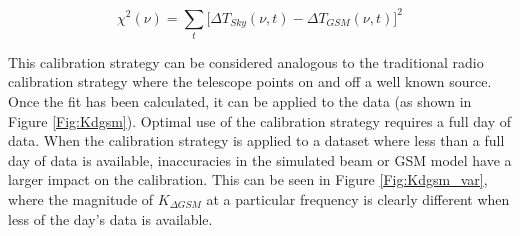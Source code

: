 \begin{equation}\label{Eq:chi_sq}
\chi^2(\nu) =  \sum_t \big [ \Delta T_{Sky}(\nu,t) - \Delta T_{GSM}(\nu,t) \big ]^2
\end{equation}

This calibration strategy can be considered analogous to the traditional radio calibration strategy where the telescope points on and off a well known source. Once the fit has been calculated, it can be applied to the data (as shown in Figure \ref{Fig:Kdgsm}). Optimal use of the calibration strategy requires a full day of data. When the calibration strategy is applied to a dataset where less than a full day of data is available, inaccuracies in the simulated beam or GSM model have a larger impact on the calibration. This can be seen in Figure \ref{Fig:Kdgsm_var}, where the magnitude of $K_{\Delta GSM}$ at a particular frequency is clearly different when less of the day's data is available. 

